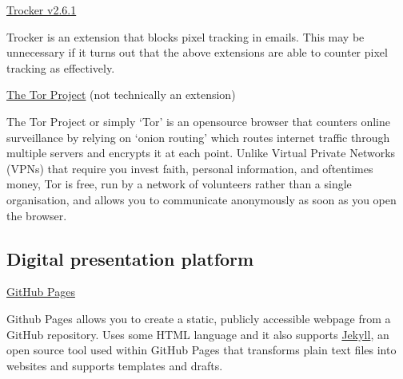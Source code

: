 \documentclass{article}
\begin{document}
\noindent\href{https://trockerapp.github.io/}{Trocker v2.6.1}

Trocker is an extension that blocks pixel tracking in emails. This may be unnecessary if it turns out that the above extensions are able to counter pixel tracking as effectively. \newline

\noindent\href{https://www.torproject.org/}{The Tor Project} (not technically an extension)

The Tor Project or simply ‘Tor’ is an opensource browser that counters online surveillance by relying on ‘onion routing’ which routes internet traffic through multiple servers and encrypts it at each point. Unlike Virtual Private Networks (VPNs) that require you invest faith, personal information, and oftentimes money, Tor is free, run by a network of volunteers rather than a single organisation, and allows you to communicate anonymously as soon as you open the browser.    

\subsection{Digital presentation platform}
\href{https://pages.github.com/}{GitHub Pages}

Github Pages allows you to create a static, publicly accessible webpage from a GitHub repository. Uses some HTML language and it also supports \href{https://github.com/jekyll/jekyll}{Jekyll}, an open source tool used within GitHub Pages that transforms plain text files into websites and supports templates and drafts. 
\end{document}
